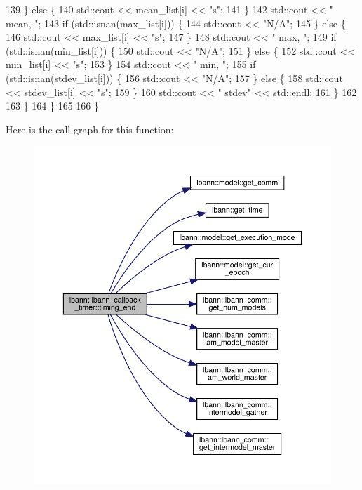 \begin{DoxyCode}
139         \} \textcolor{keywordflow}{else} \{
140           std::cout << mean\_list[i] << \textcolor{stringliteral}{"s"};
141         \}
142         std::cout << \textcolor{stringliteral}{" mean, "};
143         \textcolor{keywordflow}{if} (std::isnan(max\_list[i])) \{
144           std::cout << \textcolor{stringliteral}{"N/A"};
145         \} \textcolor{keywordflow}{else} \{
146           std::cout << max\_list[i] << \textcolor{stringliteral}{"s"};
147         \}
148         std::cout << \textcolor{stringliteral}{" max, "};
149         \textcolor{keywordflow}{if} (std::isnan(min\_list[i])) \{
150           std::cout << \textcolor{stringliteral}{"N/A"};
151         \} \textcolor{keywordflow}{else} \{
152           std::cout << min\_list[i] << \textcolor{stringliteral}{"s"};
153         \}
154         std::cout << \textcolor{stringliteral}{" min, "};
155         \textcolor{keywordflow}{if} (std::isnan(stdev\_list[i])) \{
156           std::cout << \textcolor{stringliteral}{"N/A"};
157         \} \textcolor{keywordflow}{else} \{
158           std::cout << stdev\_list[i] << \textcolor{stringliteral}{"s"};
159         \}
160         std::cout << \textcolor{stringliteral}{" stdev"} << std::endl;
161       \}
162 
163     \}
164   \}
165 
166 \}
\end{DoxyCode}
Here is the call graph for this function\+:\nopagebreak
\begin{figure}[H]
\begin{center}
\leavevmode
\includegraphics[width=350pt]{classlbann_1_1lbann__callback__timer_a955e59858c6803e96b21fe494cdf3971_cgraph}
\end{center}
\end{figure}
